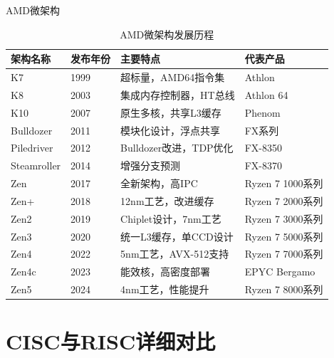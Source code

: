 \documentclass[12pt,UTF8]{ctexbook}
\begin{document}
\begin{subsection}{AMD微架构}

\begin{table}[H]
    \centering
    \begin{tabular}{|p{2cm}|p{3cm}|p{6cm}|p{3cm}|}
        \hline
        \textbf{架构名称} & \textbf{发布年份} & \textbf{主要特点} & \textbf{代表产品} \\
        \hline
        K7 & 1999 & 超标量，AMD64指令集 & Athlon \\
        \hline
        K8 & 2003 & 集成内存控制器，HT总线 & Athlon 64 \\
        \hline
        K10 & 2007 & 原生多核，共享L3缓存 & Phenom \\
        \hline
        Bulldozer & 2011 & 模块化设计，浮点共享 & FX系列 \\
        \hline
        Piledriver & 2012 & Bulldozer改进，TDP优化 & FX-8350 \\
        \hline
        Steamroller & 2014 & 增强分支预测 & FX-8370 \\
        \hline
        Zen & 2017 & 全新架构，高IPC & Ryzen 7 1000系列 \\
        \hline
        Zen+ & 2018 & 12nm工艺，改进缓存 & Ryzen 7 2000系列 \\
        \hline
        Zen2 & 2019 & Chiplet设计，7nm工艺 & Ryzen 7 3000系列 \\
        \hline
        Zen3 & 2020 & 统一L3缓存，单CCD设计 & Ryzen 7 5000系列 \\
        \hline
        Zen4 & 2022 & 5nm工艺，AVX-512支持 & Ryzen 7 7000系列 \\
        \hline
        Zen4c & 2023 & 能效核，高密度部署 & EPYC Bergamo \\
        \hline
        Zen5 & 2024 & 4nm工艺，性能提升 & Ryzen 7 8000系列 \\
        \hline
    \end{tabular}
    \caption{AMD微架构发展历程}
    \label{tab:amd_microarchitecture}
\end{table}

\end{subsection}

\section{CISC与RISC详细对比}
\end{document}
